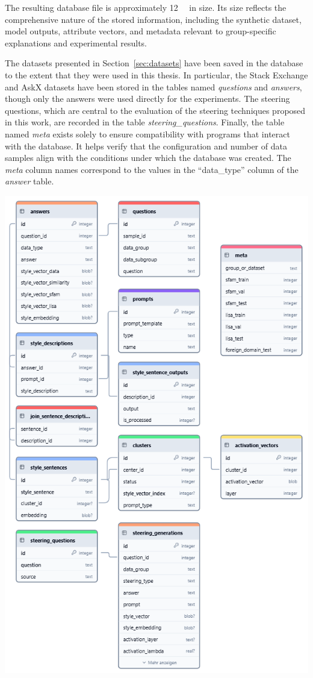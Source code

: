 The resulting database file is approximately \SI{12}{\giga\byte} in size. Its size reflects the comprehensive nature of the stored information, including the synthetic dataset, model outputs, attribute vectors, and metadata relevant to group-specific explanations and experimental results.

The datasets presented in Section~\ref{sec:datasets} have been saved in the database to the extent that they were used in this thesis. In particular, the Stack Exchange and AskX datasets have been stored in the tables named \textit{questions} and \textit{answers}, though only the answers were used directly for the experiments. The steering questions, which are central to the evaluation of the steering techniques proposed in this work, are recorded in the table \textit{steering\_questions}. Finally, the table named \textit{meta} exists solely to ensure compatibility with programs that interact with the database. It helps verify that the configuration and number of data samples align with the conditions under which the database was created. The \textit{meta} column names correspond to the values in the \enquote{data\_type} column of the \textit{answer} table.

\begin{center}
  \includegraphics[width=\linewidth]{figures/sqlite-db.png}
\end{center}
